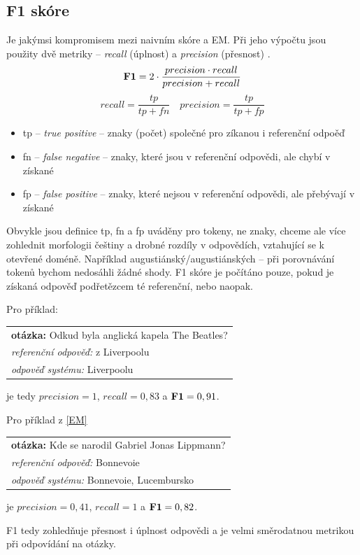 \subsection{F1 skóre}
Je jakýmsi kompromisem mezi naivním skóre a EM. Při jeho výpočtu jsou použity dvě metriky -- \emph{recall} (úplnost) a \emph{precision} (přesnost) \cite{information_retrieval}.
\begin{equation}
    \text{\textbf{F1}} = 2\cdot \frac{precision \cdot recall}{precision + recall} 
\end{equation}
\begin{equation}
recall = \frac{tp}{tp+fn} \quad precision = \frac{tp}{tp+fp}
\end{equation}

\begin{itemize}
    \item tp -- \emph{true positive} -- znaky (počet) společné pro zíkanou i referenční odpoěď
    \item fn -- \emph{false negative} -- znaky, které jsou v referenční odpovědi, ale chybí v získané
    \item fp -- \emph{false positive} -- znaky, které nejsou v referenční odpovědi, ale přebývají v získané
\end{itemize}

Obvykle jsou definice tp, fn a fp uváděny pro tokeny, ne znaky, chceme ale více zohlednit morfologii češtiny a drobné rozdíly v odpovědích, vztahující se k otevřené doméně. Například augustiánský/augustiánských -- při porovnávání tokenů bychom nedosáhli žádné shody. F1 skóre je počítáno pouze, pokud je získaná odpověď podřetězcem té referenční, nebo naopak.\par \medskip
\noindent Pro příklad: 
\begin{center}
\begin{tabular}{l}
    \textbf{otázka:} Odkud byla anglická kapela The Beatles?\\
    \emph{referenční odpověď:} z Liverpoolu\\
    \emph{odpověď systému:} Liverpoolu\\
\end{tabular}
\end{center}
je tedy $precision = 1$, $recall = 0,83$ a $\text{\textbf{F1}} = 0,91$.\par \medskip
\noindent Pro příklad z \ref{EM}
\begin{center}
\begin{tabular}{l}
    \textbf{otázka:} Kde se narodil Gabriel Jonas Lippmann?\\
    \emph{referenční odpověď:} Bonnevoie\\
    \emph{odpověď systému:} Bonnevoie, Lucembursko\\
\end{tabular}
\end{center}
je $precision = 0,41$, $recall = 1$ a $\text{\textbf{F1}} = 0,82$.\par \medskip
F1 tedy zohledňuje přesnost i úplnost odpovědi a je velmi směrodatnou metrikou při odpovídání na otázky.

